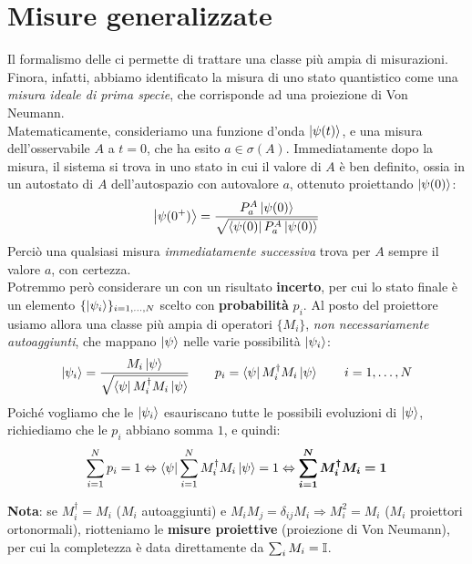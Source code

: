 \documentclass[../../InformazioneQuantistica.tex]{subfiles}
\begin{document}
\section{Misure generalizzate}
Il formalismo delle  ci permette di trattare una classe più ampia di misurazioni.\\
Finora, infatti, abbiamo identificato la misura di uno stato quantistico come una \textit{misura ideale di prima specie}, che corrisponde ad una proiezione di Von Neumann.\\
Matematicamente, consideriamo una funzione d'onda $\Ket{\psi(t)}$, e una misura dell'osservabile $A$ a $t=0$, che ha esito $a\in \sigma(A)$. Immediatamente dopo la misura, il sistema si trova in uno stato in cui il valore di $A$ è ben definito, ossia in un autostato di $A$ dell'autospazio con autovalore $a$, ottenuto proiettando $\Ket{\psi(0)}$:
\begin{align*}
\Ket{\psi(0^+)} = \frac{P_a^A \Ket{\psi(0)}}{\sqrt{\Bra{\psi(0)}P_a^A \Ket{\psi(0)}}}
\end{align*}
Perciò una qualsiasi misura \textit{immediatamente successiva} trova per $A$ sempre il valore $a$, con certezza.\\

Potremmo però considerare un  con un risultato \textbf{incerto}, per cui lo stato finale è un elemento $\{\Ket{\psi_i}\}_{i=1,\dots,N}$ scelto con \textbf{probabilità} $p_i$. Al posto del proiettore usiamo allora una classe più ampia di operatori $\{M_i\}$, \textit{non necessariamente autoaggiunti}, che mappano $\Ket{\psi}$ nelle varie possibilità $\Ket{\psi_i}$: 
\begin{align*}
\Ket{\psi_i} = \frac{M_i \Ket{\psi}}{\sqrt{\Bra{\psi}M_i^\dag M_i\Ket{\psi}}} \qquad p_i = \Bra{\psi}M_i^\dag M_i \Ket{\psi} \qquad i=1,\dots,N
\end{align*}
Poiché vogliamo che le $\Ket{\psi_i}$ esauriscano tutte le possibili evoluzioni di $\Ket{\psi}$, richiediamo che le $p_i$ abbiano somma $1$, e quindi: 
\begin{align}
\sum_{i=1}^N p_i = 1 \Leftrightarrow \Bra{\psi} \sum_{i=1}^N M_i^\dag M_i\Ket{\psi} = 1 \Leftrightarrow \bm{\sum_{i=1}^N M_i^\dag M_i = 1}
\label{eqn:condizione-misure}
\end{align}

\textbf{Nota}: se $M_i^\dag = M_i$ ($M_i$ autoaggiunti) e $M_i M_j = \delta_{ij}M_i \Rightarrow M_i^2 = M_i$ ($M_i$ proiettori ortonormali), riotteniamo le \textbf{misure proiettive} (proiezione di Von Neumann), per cui la completezza è data direttamente da $\sum_i M_i = \mathbb{I}$.
\end{document}
